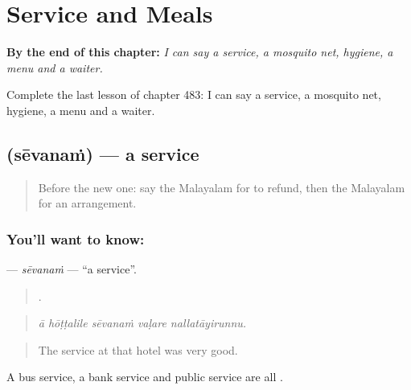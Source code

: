 
\chapter{Service and Meals}
\label{ch:ml-service-and-meals}

\begin{chapteropening}
\textbf{By the end of this chapter:} \emph{I can say a service, a mosquito net, hygiene, a menu and a waiter.}

Complete the last lesson of chapter 483: I can say a service, a mosquito net, hygiene, a menu and a waiter.
\end{chapteropening}

\section[\texorpdfstring{\ml{സേവനം} (sēvanaṁ)}{സേവനം (sēvanaṁ)}]{ (sēvanaṁ) — a service}

\label{lesson:ML-C483-sevanam}



\begin{quote}
Before the new one: say the Malayalam for to refund, then the Malayalam for an arrangement.
\end{quote}

\subsection*{You'll want to know: }
\textbf{} — \emph{sēvanaṁ} — \textquotedblleft{}a service\textquotedblright{}.

\begin{quote}
    .
\end{quote}

\begin{quote}
\emph{ā hōṭṭalile sēvanaṁ vaḷare nallatāyirunnu.}
\end{quote}

\begin{quote}
The service at that hotel was very good.
\end{quote}

A bus service, a bank service and public service are all .

